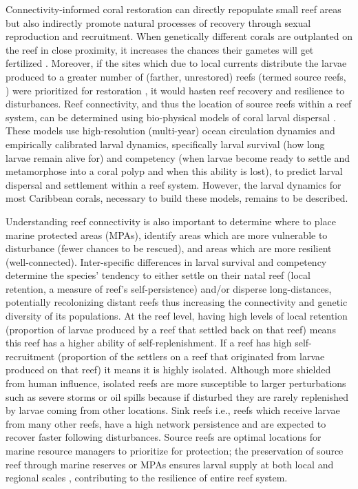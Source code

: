 \documentclass[preprint,12pt,authoryear]{elsarticle}
\begin{document}
Connectivity-informed coral restoration can directly repopulate small reef areas but also indirectly promote natural processes of recovery through sexual reproduction and recruitment. When genetically different corals are outplanted on the reef in close proximity, it increases the chances their gametes will get fertilized \citep{omori2019coral}. Moreover, if the sites which due to local currents distribute the larvae produced to a greater number of (farther, unrestored) reefs (termed source reefs, \citealp{bode2018resilient}) were prioritized for restoration \citep{king2023larval}, it would hasten reef recovery and resilience to disturbances. Reef connectivity, and thus the location of source reefs within a reef system, can be determined using bio-physical models of coral larval dispersal \citep{frys2020fine, figueiredo2022global,king2023larval}. These models use high-resolution (multi-year) ocean circulation dynamics and empirically calibrated larval dynamics, specifically larval survival (how long larvae remain alive for) and competency (when larvae become ready to settle and metamorphose into a coral polyp and when this ability is lost), to predict larval dispersal and settlement within a reef system. However, the larval dynamics for most Caribbean corals, necessary to build these models, remains to be described.

Understanding reef connectivity is also important to determine where to place marine protected areas (MPAs), identify areas which are more vulnerable to disturbance (fewer chances to be rescued), and areas which are more resilient (well-connected). Inter-specific differences in larval survival and competency determine the species’ tendency to either settle on their natal reef (local retention, a measure of reef’s self-persistence) and/or disperse long-distances, potentially recolonizing distant reefs thus increasing the connectivity and genetic diversity of its populations. At the reef level, having high levels of local retention (proportion of larvae produced by a reef that settled back on that reef) means this reef has a higher ability of self-replenishment. If a reef has high self-recruitment (proportion of the settlers on a reef that originated from larvae produced on that reef) it means it is highly isolated.  Although more shielded from human influence, isolated reefs are more susceptible to larger perturbations such as severe storms or oil spills \citep{baumann2022remoteness} because if disturbed they are rarely replenished by larvae coming from other locations. Sink reefs i.e., reefs which receive larvae from many other reefs, have a high network persistence and are expected to recover faster following disturbances. Source reefs are optimal locations for marine resource managers to prioritize for protection; the preservation of source reef through marine reserves or MPAs ensures larval supply at both local and regional scales \citep{muenzel2023integrating}, contributing to the resilience of entire reef system.
\end{document}
